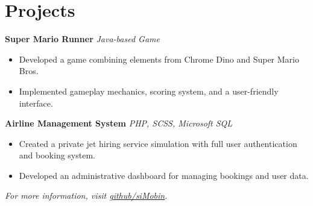 \section*{Projects}

\textbf{Super Mario Runner} \hfill \textit{Java-based Game} \\
\begin{itemize}[leftmargin=1cm, label={\color{primary}\textbullet}]
    \item Developed a game combining elements from Chrome Dino and Super Mario Bros.
    \item Implemented gameplay mechanics, scoring system, and a user-friendly interface.
\end{itemize}
\vspace{5mm}
\textbf{Airline Management System} \hfill \textit{PHP, SCSS, Microsoft SQL} \\
\begin{itemize}[leftmargin=1cm, label={\color{primary}\textbullet}]
    \item Created a private jet hiring service simulation with full user authentication and booking system.
    \item Developed an administrative dashboard for managing bookings and user data.
\end{itemize}
\vspace{3mm}
\textit{For more information, visit \href{https://github.com/siMobin/}{github/siMobin}.}
